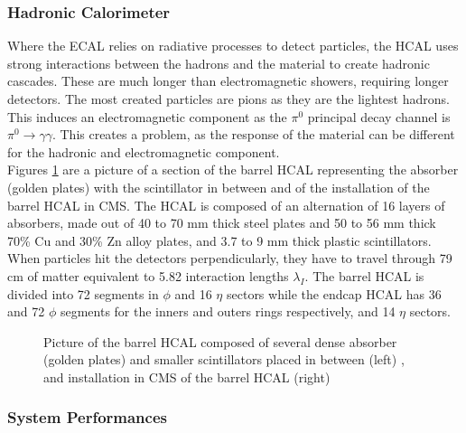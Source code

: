 			\subsubsection{Hadronic Calorimeter}
			\label{sec:lhc_and_cms__hadronic_calorimeter}

				Where the ECAL relies on radiative processes to detect particles, the HCAL uses strong interactions between the hadrons and the material to create hadronic cascades. These are much longer than electromagnetic showers, requiring longer detectors. The most created particles are pions as they are the lightest hadrons. This induces an electromagnetic component as the $ \pi^0 $ principal decay channel is $ \pi^0 \rightarrow \gamma \gamma $. This creates a problem, as the response of the material can be different for the hadronic and electromagnetic component. \\

				Figures \ref{fig:lhc_and_cms__cms_hcal_view} are a picture of a section of the barrel HCAL representing the absorber (golden plates) with the scintillator in between and of the installation of the barrel HCAL in CMS. The HCAL is composed of an alternation of 16 layers of absorbers, made out of 40 to 70 mm thick steel plates and 50 to 56 mm thick 70\% Cu and 30\% Zn alloy plates, and 3.7 to 9 mm thick plastic scintillators. When particles hit the detectors perpendicularly, they have to travel through 79 cm of matter equivalent to 5.82 interaction lengths $ \lambda_I $. The barrel HCAL is divided into 72 segments in $ \phi $ and 16 $ \eta $ sectors while the endcap HCAL has 36 and 72 $ \phi $ segments for the inners and outers rings respectively, and 14 $ \eta $ sectors.

				\begin{figure}[h!]
					\centering
					\caption{Picture of the barrel HCAL composed of several dense absorber (golden plates) and smaller scintillators placed in between (left) \Cite{CMS_at_LHC}, and installation in CMS of the barrel HCAL (right) \Cite{CMS_HCAL_Install}}
					\label{fig:lhc_and_cms__cms_hcal_view}
				\end{figure}

			\subsubsection{System Performances}
			\label{sec:lhc_and_cms__calorimeters_system_performances}

